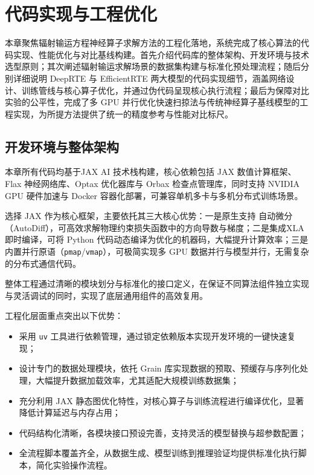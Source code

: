 \chapter{代码实现与工程优化}

本章聚焦辐射输运方程神经算子求解方法的工程化落地，系统完成了核心算法的代码实现、性能优化与对比基线构建。首先介绍代码库的整体架构、开发环境与技术选型原则；其次阐述辐射输运求解场景的数据集构建与标准化预处理流程；随后分别详细说明 DeepRTE 与 EfficientRTE 两大模型的代码实现细节，涵盖网络设计、训练管线与核心算子优化，并通过伪代码呈现核心执行流程；最后为保障对比实验的公平性，完成了多 GPU 并行优化快速扫掠法与传统神经算子基线模型的工程实现，为所提方法提供了统一的精度参考与性能对比标尺。

\section{开发环境与整体架构}
本章所有代码均基于JAX AI 技术栈构建，核心依赖包括 JAX 数值计算框架、Flax 神经网络库、Optax 优化器库与 Orbax 检查点管理库，同时支持 NVIDIA GPU 硬件加速与 Docker 容器化部署，可兼容单机多卡与多机分布式训练场景。

选择 JAX 作为核心框架，主要依托其三大核心优势：一是原生支持 自动微分（AutoDiff），可高效求解物理约束损失函数中的方向导数与梯度；二是集成XLA 即时编译，可将 Python 代码动态编译为优化的机器码，大幅提升计算效率；三是内置并行原语（\texttt {pmap}/\texttt {vmap}），可极简实现多 GPU 数据并行与模型并行，无需复杂的分布式通信代码。

整体工程通过清晰的模块划分与标准化的接口定义，在保证不同算法组件独立实现与灵活调试的同时，实现了底层通用组件的高效复用。

工程化层面重点突出以下优势：
\begin{itemize}
    \item 采用 \texttt {uv} 工具进行依赖管理，通过锁定依赖版本实现开发环境的一键快速复现；
    \item 设计专门的数据处理模块，依托 Grain 库实现数据的预取、预缓存与序列化处理，大幅提升数据加载效率，尤其适配大规模训练数据集；
    \item 充分利用 JAX 静态图优化特性，对核心算子与训练流程进行编译优化，显著降低计算延迟与内存占用；
    \item 代码结构化清晰，各模块接口预设完善，支持灵活的模型替换与超参数配置；
    \item 全流程脚本覆盖齐全，从数据生成、模型训练到推理验证均提供标准化执行脚本，简化实验操作流程。
\end{itemize}


